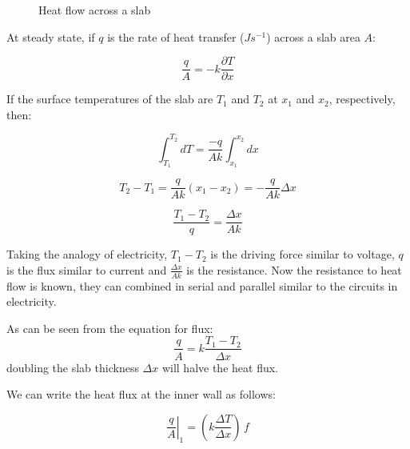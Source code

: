 \begin{figure}[h]
\begin{center}
\end{center}
\caption{Heat flow across a slab}
\label{slab}
\end{figure}

At steady state, if $q$ is the rate of heat transfer ($Js^{-1}$) across a slab
area $A$:

$$ \frac{q}{A} = -k \frac{\partial T}{\partial x} $$

If the surface temperatures of the slab are $T_1$ and $T_2$ at $x_1$ and $x_2$,
respectively, then:

$$ \int_{T_1}^{T_2}{dT} = \frac{-q}{Ak} \int_{x_1}^{x_2}{dx} $$

$$ T_2 - T_1 = \frac{q}{Ak} (x_1 - x_2) = - \frac{q}{Ak} \Delta x $$

\begin{equation}
\boxed{
  \frac{T_1 - T_2}{q} = \frac{\Delta x}{Ak}
}
\end{equation}

Taking the analogy of electricity, $T_1 - T_2$ is the driving force similar to
voltage, $q$ is the flux similar to current and $\frac{\Delta x}{Ak}$ is the
resistance. Now the resistance to heat flow is known, they can combined in
serial and parallel similar to the circuits in electricity.

As can be seen from the equation for flux:
$$\frac{q}{A} = k \frac{T_1 - T_2}{\Delta x}$$
doubling the slab thickness $\Delta x$ will halve the heat flux.

We can write the heat flux at the inner wall as follows:

\begin{equation}
	\left. \frac{q}{A} \right|_{1} = \left( k \frac{\Delta T}{\Delta x} \right) \, f 
\end{equation}

